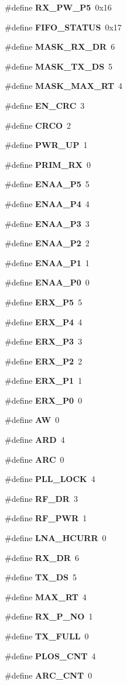 \begin{CompactItemize}
\#define {\bf RX\_\-PW\_\-P5}~0x16
\item 
\#define {\bf FIFO\_\-STATUS}~0x17
\item 
\#define {\bf MASK\_\-RX\_\-DR}~6
\item 
\#define {\bf MASK\_\-TX\_\-DS}~5
\item 
\#define {\bf MASK\_\-MAX\_\-RT}~4
\item 
\#define {\bf EN\_\-CRC}~3
\item 
\#define {\bf CRCO}~2
\item 
\#define {\bf PWR\_\-UP}~1
\item 
\#define {\bf PRIM\_\-RX}~0
\item 
\#define {\bf ENAA\_\-P5}~5
\item 
\#define {\bf ENAA\_\-P4}~4
\item 
\#define {\bf ENAA\_\-P3}~3
\item 
\#define {\bf ENAA\_\-P2}~2
\item 
\#define {\bf ENAA\_\-P1}~1
\item 
\#define {\bf ENAA\_\-P0}~0
\item 
\#define {\bf ERX\_\-P5}~5
\item 
\#define {\bf ERX\_\-P4}~4
\item 
\#define {\bf ERX\_\-P3}~3
\item 
\#define {\bf ERX\_\-P2}~2
\item 
\#define {\bf ERX\_\-P1}~1
\item 
\#define {\bf ERX\_\-P0}~0
\item 
\#define {\bf AW}~0
\item 
\#define {\bf ARD}~4
\item 
\#define {\bf ARC}~0
\item 
\#define {\bf PLL\_\-LOCK}~4
\item 
\#define {\bf RF\_\-DR}~3
\item 
\#define {\bf RF\_\-PWR}~1
\item 
\#define {\bf LNA\_\-HCURR}~0
\item 
\#define {\bf RX\_\-DR}~6
\item 
\#define {\bf TX\_\-DS}~5
\item 
\#define {\bf MAX\_\-RT}~4
\item 
\#define {\bf RX\_\-P\_\-NO}~1
\item 
\#define {\bf TX\_\-FULL}~0
\item 
\#define {\bf PLOS\_\-CNT}~4
\item 
\#define {\bf ARC\_\-CNT}~0
\item 

\end{CompactItemize}

